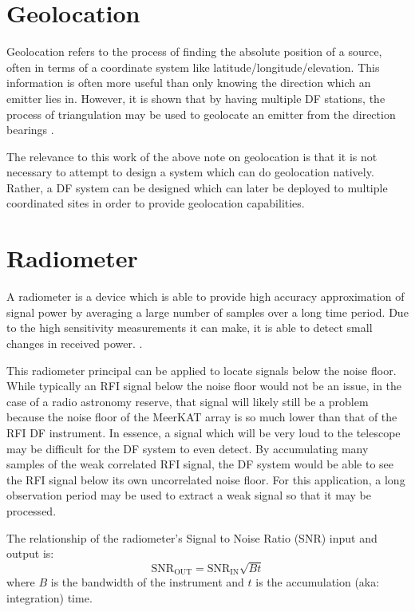 \section{Geolocation}
Geolocation refers to the process of finding the absolute position of a source, often in terms of a coordinate system like latitude/longitude/elevation. This information is often more useful than only knowing the direction which an emitter lies in. However, it is shown that by having multiple DF stations, the process of triangulation may be used to geolocate an emitter from the direction bearings \cite{poisel2012electronic}. 

The relevance to this work of the above note on geolocation is that it is not necessary to attempt to design a system which can do geolocation natively. Rather, a DF system can be designed which can later be deployed to multiple coordinated sites in order to provide geolocation capabilities. 

\section{Radiometer}
A radiometer is a device which is able to provide high accuracy approximation of signal power by averaging a large number of samples over a long time period. Due to the high sensitivity measurements it can make, it is able to detect small changes in received power\cite{nraoradiometers}. \cite{casperradiometerequation}.

This radiometer principal can be applied to locate signals below the noise floor. While typically an RFI signal below the noise floor would not be an issue, in the case of a radio astronomy reserve, that signal will likely still be a problem because the noise floor of the MeerKAT array is so much lower than that of the RFI DF instrument. In essence, a signal which will be very loud to the telescope may be difficult for the DF system to even detect. By accumulating many samples of the weak correlated RFI signal, the DF system would be able to see the RFI signal below its own uncorrelated noise floor. For this application, a long observation period may be used to extract a weak signal so that it may be processed.

The relationship of the radiometer's Signal to Noise Ratio (SNR) input and output is: \cite{casperradiometerequation}
\begin{equation}
  \text{SNR}_{\text{OUT}} = \text{SNR}_{\text{IN}}\sqrt{Bt}
\end{equation}
where \(B\) is the bandwidth of the instrument and \(t\) is the accumulation (aka: integration) time.

